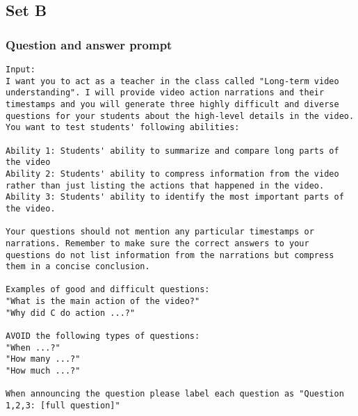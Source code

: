\subsection{Set B}
\subsubsection{Question and answer prompt}
\begin{lstlisting}
Input:
I want you to act as a teacher in the class called "Long-term video understanding". I will provide video action narrations and their timestamps and you will generate three highly difficult and diverse questions for your students about the high-level details in the video. You want to test students' following abilities:

Ability 1: Students' ability to summarize and compare long parts of the video
Ability 2: Students' ability to compress information from the video rather than just listing the actions that happened in the video.
Ability 3: Students' ability to identify the most important parts of the video. 

Your questions should not mention any particular timestamps or narrations. Remember to make sure the correct answers to your questions do not list information from the narrations but compress them in a concise conclusion.

Examples of good and difficult questions:
"What is the main action of the video?"
"Why did C do action ...?"

AVOID the following types of questions:
"When ...?"
"How many ...?"
"How much ...?"

When announcing the question please label each question as "Question 1,2,3: [full question]"


\end{lstlisting}
